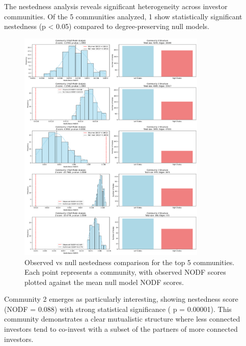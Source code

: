 \documentclass[12pt]{article}
\begin{document}
\newcommand{\numCommAnalysedNestedness}{5}

The nestedness analysis reveals significant heterogeneity across investor communities. Of the \numCommAnalysedNestedness{} communities analyzed, 1 show statistically significant nestedness (p < 0.05) compared to degree-preserving null models.

\begin{figure}[htbp]
\centering
\includegraphics[width=0.8\textwidth]{./assets/null-model-analysis-top-5.png}
\caption{Observed vs null nestedness comparison for the top \numCommAnalysedNestedness{} communities. Each point represents a community, with observed NODF scores plotted against the mean null model NODF scores.}
\label{fig:nestedness_comparison}
\end{figure}


\newcommand{\interestingCommunity}{2}
\newcommand{\interestingCommunityNODF}{0.088}
\newcommand{\interestingCommunityPValue}{0.00001}

Community \interestingCommunity{} emerges as particularly interesting, showing nestedness score (NODF = \interestingCommunityNODF{}) with strong statistical significance ( p = \interestingCommunityPValue{}). This community demonstrates a clear mutualistic structure where less connected investors tend to co-invest with a subset of the partners of more connected investors.
\end{document}
